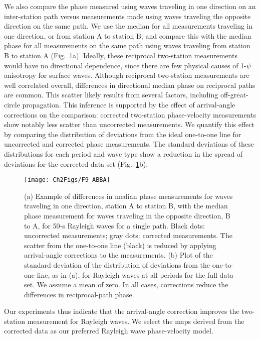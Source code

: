 \documentclass[12pt,oneside]{book}
\begin{document}
We also compare the phase measured using waves traveling in one direction on an inter-station path versus measurements made using waves traveling the opposite direction on the same path. We use the median for all measurements traveling in one direction, or from station A to station B, and compare this with the median phase for all measurements on the same path using waves traveling from station B to station A (Fig.~\ref{figpv:ABBA_allper}a). Ideally, these reciprocal two-station measurements would have no directional dependence, since there are few physical causes of 1\nobreakdash-$\psi$ anisotropy for surface waves. Although reciprocal two-station measurements are well correlated overall, differences in directional median phase on reciprocal paths are common. This scatter likely results from several factors, including off-great-circle propagation. This inference is supported by the effect of arrival-angle corrections on the comparison: corrected two-station phase-velocity measurements show notably less scatter than uncorrected measurements. We quantify this effect by comparing the distribution of deviations from the ideal one-to-one line for uncorrected and corrected phase measurements. The standard deviations of these distributions for each period and wave type show a reduction in the spread of deviations for the corrected data set (Fig.~\ref{figpv:ABBA_allper}b). 

\begin{figure} 
\begin{center}
\texttt{[image: Ch2Figs/F9\_ABBA]} 
\caption[Reciprocal-path phase differences for baseline and corrected two-station measurements]{(a) Example of differences in median phase measurements for waves traveling in one direction, station A to station B, with the median phase measurement for waves traveling in the opposite direction, B to A, for 50-s Rayleigh waves for a single path. Black dots: uncorrected measurements; gray dots: corrected measurements. The scatter from the one-to-one line (black) is reduced by applying arrival-angle corrections to the measurements. (b) Plot of the standard deviation of the distribution of deviations from the one-to-one line, as in (a), for Rayleigh waves at all periods for the full data set. We assume a mean of zero. In all cases, corrections reduce the differences in reciprocal-path phase. }
\label{figpv:ABBA_allper}
\end{center}
\end{figure}
%

Our experiments thus indicate that the arrival-angle correction improves the two-station measurement for Rayleigh waves. We select the maps derived from the corrected data as our preferred Rayleigh wave phase-velocity model.  
\end{document}
